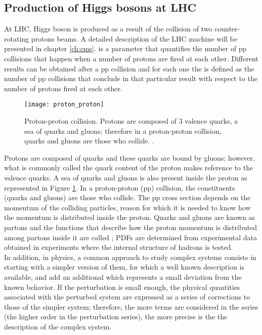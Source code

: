 \subsection{Production of Higgs bosons at LHC}

At LHC, Higgs boson is produced as a result of the collision of two counter-rotating protons beams. A detailed description of the LHC machine will be presented in chapter \ref{ch:cms}.  is a parameter that quantifies the number of pp collisions that happen when a number of protons are fired at each other. Different results can be obtained after a pp collision and for each one the  is defined as the number of pp collisions that conclude in that particular result with respect to the number of protons fired at each other.
\begin{figure}[!h]
\centering
\texttt{[image: proton\_proton]}
\caption[Proton-Proton collision]{Proton-proton collision. Protons are composed of 3 valence quarks, a sea of quarks and gluons; therefore in a proton-proton collision, quarks and gluons are those who collide. \cite{pp_coll}.}
\label{pp_collision}
\end{figure}

Protons are composed of quarks and these quarks are bound by gluons; however, what is commonly called the quark content of the proton makes reference to the valence quarks. A sea of quarks and gluons is also present inside the proton as represented in Figure \ref{pp_collision}. In a proton-proton (pp) collision, the constituents (quarks and gluons) are those who collide. The pp cross section depends on the momentum of the colliding particles, reason for which it is needed to know how the momentum is distributed inside the proton. Quarks and gluons are known as partons and the functions that describe how the proton momentum is distributed among partons inside it are called ; PDFs are determined from experimental data obtained in experiments where the internal structure of hadrons is tested.\\

In addition, in physics, a common approach to study complex systems consists in starting with a simpler version of them, for which a well known description is available, and add an additional  which represents a small deviation from the known behavior. If the perturbation is small enough, the physical quantities associated with the perturbed system are expressed as a series of corrections to those of the simpler system; therefore, the more terms are considered in the series (the higher order in the perturbation series), the more precise is the the description of the complex system.\\

